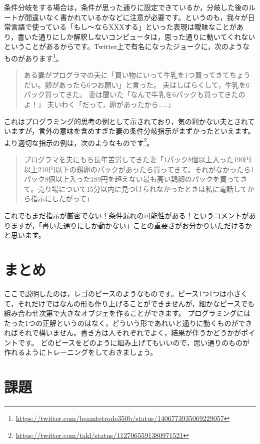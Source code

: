 \documentclass{ltjsbook}
\begin{document}
条件分岐をする場合は，条件が思った通りに設定できているか，分岐した後のルートが間違いなく書かれているかなどに注意が必要です。というのも，我々が日常言語で使っている「もし〜ならXXXする」といった表現は曖昧なことがあり，書いた通りにしか解釈しないコンピュータは，思った通りに動いてくれないということがあるからです。Twitter上で有名になったジョークに，次のようなものがあります\footnote{\url{https://twitter.com/beamtetrode350b/status/1406773935069229057}}。

\begin{quote}
	ある妻がプログラマの夫に「買い物にいって牛乳を1つ買ってきてちょうだい。卵があったら6つお願い」と言った。
	夫はしばらくして，牛乳を6パック買ってきた。
	妻は聞いた「なんで牛乳を6パックも買ってきたのよ！」
	夫いわく「だって，卵があったから……」
\end{quote}

これはプログラミング的思考の例として示されており，気の利かない夫とされていますが，言外の意味を含めすぎた妻の条件分岐指示がまずかったといえます。より適切な指示の例は，次のようなものです\footnote{\url{https://twitter.com/takl/status/1127065591380971521}}。

\begin{quote}
	プログラマを夫にもち長年苦労してきた妻「1パック8個以上入った190円以上210円以下の鶏卵のパックがあったら買ってきて。それがなかったら1パック8個以上入った189円を超えない最も高い鶏卵のパックを買ってきて。売り場について15分以内に見つけられなかったときは私に電話してから指示にしたがって」
\end{quote}

これでもまだ指示が厳密でない！条件漏れの可能性がある！というコメントがありますが，「書いた通りにしか動かない」ことの重要さがお分かりいただけるかと思います。


\section{まとめ}
ここで説明したのは，レゴのピースのようなものです。ピース1つ1つは小さくて，それだけではなんの形も作り上げることができませんが，細かなピースでも組み合わせ次第で大きなオブジェを作ることができます。
プログラミングにはたった1つの正解というのはなく，どういう形であれいと通りに動くものができればそれで構いません。書き方は人それぞれでよく，結果が伴うかどうかがポイントです。
どのピースをどのように組み上げてもいいので，思い通りのものが作れるようにトレーニングをしておきましょう。

\section{課題}
\end{document}
